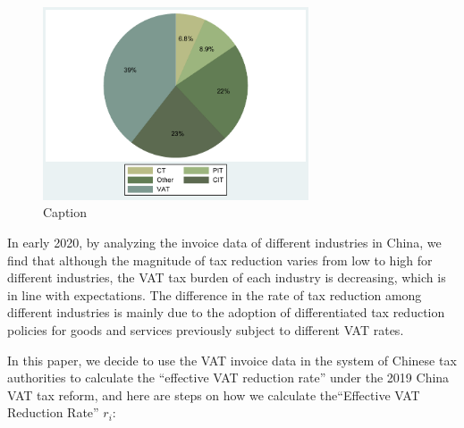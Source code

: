\documentclass[3p,times]{elsarticle}
\begin{document}
\begin{figure}
    \centering
    \includegraphics[width=0.7\textwidth]{2.pdf}
    \caption{Caption}
    \label{fig:index}
\end{figure}
In early 2020, by analyzing the invoice data of different industries in China, we find that although the magnitude of tax reduction varies from low to high for different industries, the VAT tax burden of each industry is  decreasing, which is in line with expectations. The difference in the rate of tax reduction among different industries is mainly due to the adoption of differentiated tax reduction policies for goods and services previously subject to different VAT rates.

In this paper, we decide to use the VAT invoice data in the system of Chinese tax authorities to calculate the “effective VAT reduction rate” under the 2019 China VAT tax reform, and here are steps on how we calculate the“Effective VAT Reduction Rate” $r_i$:
\end{document}

